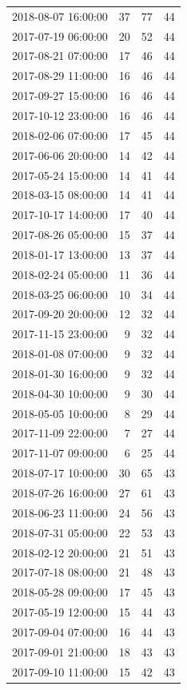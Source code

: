 \begin{tabular}{lrrr}
2018-08-07 16:00:00 & 37 & 77 & 44 \\
2017-07-19 06:00:00 & 20 & 52 & 44 \\
2017-08-21 07:00:00 & 17 & 46 & 44 \\
2017-08-29 11:00:00 & 16 & 46 & 44 \\
2017-09-27 15:00:00 & 16 & 46 & 44 \\
2017-10-12 23:00:00 & 16 & 46 & 44 \\
2018-02-06 07:00:00 & 17 & 45 & 44 \\
2017-06-06 20:00:00 & 14 & 42 & 44 \\
2017-05-24 15:00:00 & 14 & 41 & 44 \\
2018-03-15 08:00:00 & 14 & 41 & 44 \\
2017-10-17 14:00:00 & 17 & 40 & 44 \\
2017-08-26 05:00:00 & 15 & 37 & 44 \\
2018-01-17 13:00:00 & 13 & 37 & 44 \\
2018-02-24 05:00:00 & 11 & 36 & 44 \\
2018-03-25 06:00:00 & 10 & 34 & 44 \\
2017-09-20 20:00:00 & 12 & 32 & 44 \\
2017-11-15 23:00:00 & 9 & 32 & 44 \\
2018-01-08 07:00:00 & 9 & 32 & 44 \\
2018-01-30 16:00:00 & 9 & 32 & 44 \\
2018-04-30 10:00:00 & 9 & 30 & 44 \\
2018-05-05 10:00:00 & 8 & 29 & 44 \\
2017-11-09 22:00:00 & 7 & 27 & 44 \\
2017-11-07 09:00:00 & 6 & 25 & 44 \\
2018-07-17 10:00:00 & 30 & 65 & 43 \\
2018-07-26 16:00:00 & 27 & 61 & 43 \\
2018-06-23 11:00:00 & 24 & 56 & 43 \\
2018-07-31 05:00:00 & 22 & 53 & 43 \\
2018-02-12 20:00:00 & 21 & 51 & 43 \\
2017-07-18 08:00:00 & 21 & 48 & 43 \\
2018-05-28 09:00:00 & 17 & 45 & 43 \\
2017-05-19 12:00:00 & 15 & 44 & 43 \\
2017-09-04 07:00:00 & 16 & 44 & 43 \\
2017-09-01 21:00:00 & 18 & 43 & 43 \\
2017-09-10 11:00:00 & 15 & 42 & 43 \\

\end{tabular}
